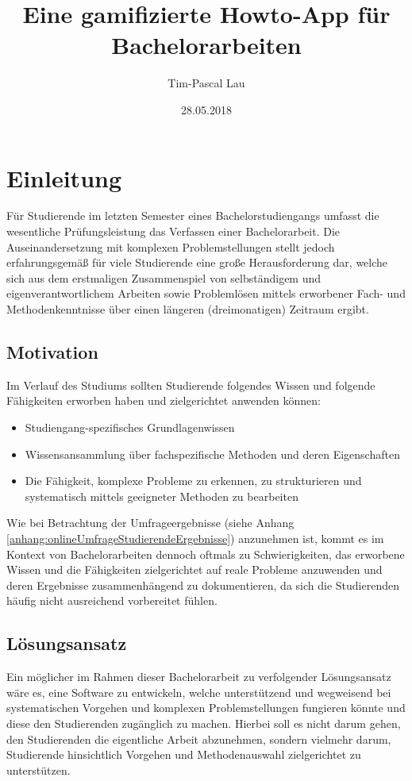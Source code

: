 \documentclass[bibliography=totoc,listof=totoc,BCOR=5mm,DIV=12,oneside]{scrbook}
\title{Eine gamifizierte Howto-App für Bachelorarbeiten}
\author{Tim-Pascal Lau}
\date{28.05.2018}
\begin{document}
\maketitle
\tableofcontents

\chapter{Einleitung}
Für Studierende im letzten Semester eines Bachelorstudiengangs umfasst die wesentliche Prüfungsleistung das Verfassen einer Bachelorarbeit.
Die Auseinandersetzung mit komplexen Problemstellungen stellt jedoch erfahrungsgemäß für viele Studierende eine große Herausforderung dar, welche sich aus dem erstmaligen Zusammenspiel von selbständigem und eigenverantwortlichem Arbeiten sowie Problemlösen mittels erworbener Fach- und Methodenkenntnisse über einen längeren (dreimonatigen) Zeitraum ergibt.

\section{Motivation}
Im Verlauf des Studiums sollten Studierende folgendes Wissen und folgende Fähigkeiten erworben haben und zielgerichtet anwenden können:
\begin{itemize}
\item Studiengang-spezifisches Grundlagenwissen
\item Wissensansammlung über fachspezifische Methoden und deren Eigenschaften
\item Die Fähigkeit, komplexe Probleme zu erkennen, zu strukturieren und systematisch mittels geeigneter Methoden zu bearbeiten
\end{itemize}
Wie bei Betrachtung der Umfrageergebnisse (siehe Anhang \ref{anhang:onlineUmfrageStudierendeErgebnisse}) anzunehmen ist, kommt es im Kontext von Bachelorarbeiten dennoch oftmals zu Schwierigkeiten, das erworbene Wissen und die Fähigkeiten zielgerichtet auf reale Probleme anzuwenden und deren Ergebnisse zusammenhängend zu dokumentieren, da sich die Studierenden häufig nicht ausreichend vorbereitet fühlen.

\section{Lösungsansatz}
Ein möglicher im Rahmen dieser Bachelorarbeit zu verfolgender Lösungsansatz wäre es, eine Software zu entwickeln, welche unterstützend und wegweisend bei systematischen Vorgehen und komplexen Problemstellungen fungieren könnte und diese den Studierenden zugänglich zu machen.
Hierbei soll es nicht darum gehen, den Studierenden die eigentliche Arbeit abzunehmen, sondern vielmehr darum, Studierende hinsichtlich Vorgehen und Methodenauswahl zielgerichtet zu unterstützen.
\end{document}
